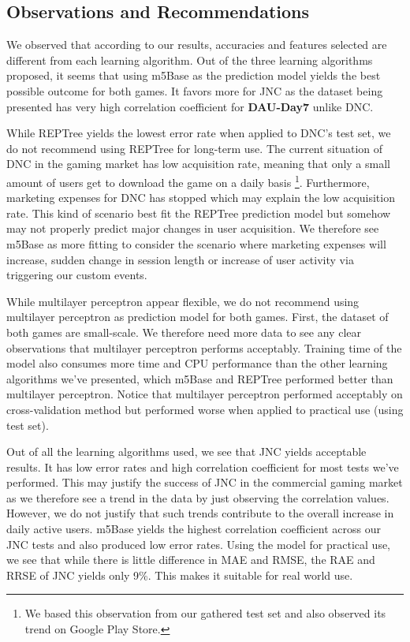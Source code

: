 \subsection{Observations and Recommendations}
We observed that according to our results, accuracies and features selected are different from each learning algorithm. Out of the three learning algorithms proposed, it seems that using m5Base as the prediction model yields the best possible outcome for both games. It favors more for JNC as the dataset being presented has very high correlation coefficient for \textbf{DAU-Day7} unlike DNC.

While REPTree yields the lowest error rate when applied to DNC's test set, we do not recommend using REPTree for long-term use. The current situation of DNC in the gaming market has low acquisition rate, meaning that only a small amount of users get to download the game on a daily basis \footnote{We based this observation from our gathered test set and also observed its trend on Google Play Store.}. Furthermore, marketing expenses for DNC has stopped which may explain the low acquisition rate. This kind of scenario best fit the REPTree prediction model but somehow may not properly predict major changes in user acquisition. We therefore see m5Base as more fitting to consider the scenario where marketing expenses will increase, sudden change in session length or increase of user activity via triggering our custom events.

While multilayer perceptron appear flexible, we do not recommend using multilayer perceptron as prediction model for both games. First, the dataset of both games are small-scale. We therefore need more data to see any clear observations that multilayer perceptron performs acceptably. Training time of the model also consumes more time and CPU performance than the other learning algorithms we've presented, which m5Base and REPTree performed better than multilayer perceptron. Notice that multilayer perceptron performed acceptably on cross-validation method but performed worse when applied to practical use (using test set).

Out of all the learning algorithms used, we see that JNC yields acceptable results. It has low error rates and high correlation coefficient for most tests we've performed. This may justify the success of JNC in the commercial gaming market as we therefore see a trend in the data by just observing the correlation values. However, we do not justify that such trends contribute to the overall increase in daily active users. m5Base yields the highest correlation coefficient across our JNC tests and also produced low error rates. Using the model for practical use, we see that while there is little difference in MAE and RMSE, the RAE and RRSE of JNC yields only 9\%. This makes it suitable for real world use.